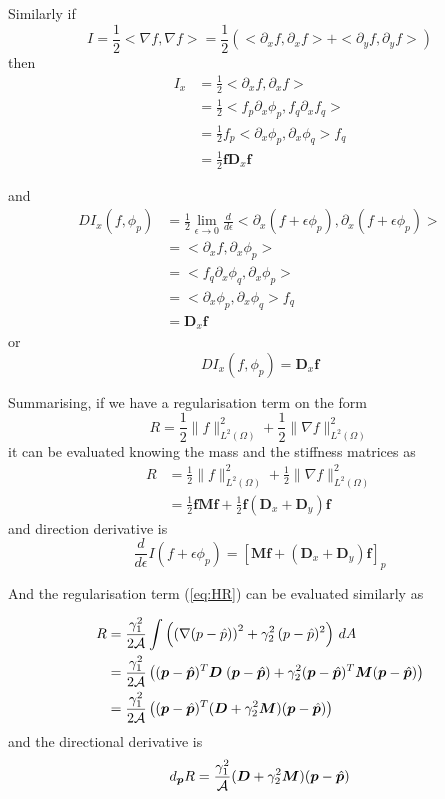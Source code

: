 \documentclass[10pt,a4paper]{book}
\newcommand{\p}{\partial}
\begin{document}
Similarly if
\[ 
I=\frac{1}{2} < \nabla f , \nabla f> = \frac{1}{2} ( <\p_x f, \p_x f> + < \p_y f, \p_y f> )
\]
then
\begin{align*}
 I_x & = \frac{1}{2} <\p_x f, \p_x f> \\ 
     &= \frac{1}{2} < f_p \p_x \phi_p, f_q \p_x f_q> \\
     &= \frac{1}{2} f_p <  \p_x \phi_p,  \p_x \phi_q> f_q\\
     &= \frac{1}{2} \bm{f} \bm{D}_x \bm{f}
\end{align*}

and
\begin{align*} 
D I_x(f,\phi_p) &= \frac{1}{2}\lim_{\epsilon \to 0} \frac{d}{d \epsilon} < \p_x (f +\epsilon \phi_p) , \p_x (f+\epsilon \phi_p) > \\
              &=  <\p_x f  , \p_x \phi_p > \\
              &=  <f_q \p_x \phi_q  , \p_x \phi_p > \\
              &=  <\p_x \phi_p  , \p_x \phi_q > f_q\\
              &= \bm{D}_x \bm{f}
\end{align*}
or
\[
D I_x(f,\phi_p) = \bm{D}_x \bm{f}
\]


Summarising, if we have a regularisation term on the form
\[
R=\frac{1}{2} \| f \|^2_{L^2(\Omega)} + \frac{1}{2} \| \nabla f \|^2_{L^2(\Omega)}
\] 
it can be evaluated knowing the mass and the stiffness matrices as
\begin{align*}  
R &= \frac{1}{2} \| f \|^2_{L^2(\Omega)} + \frac{1}{2} \| \nabla f \|^2_{L^2(\Omega)} \\
  &= \frac{1}{2} \bm{f} \bm{M} \bm{f}  + \frac{1}{2} \bm{f} (\bm{D}_x + \bm{D}_y) \bm{f}
\end{align*}
and direction derivative is 
\[ \frac{d}{d\epsilon} I(f+\epsilon \phi_p) = [\bm{M} \bm{f} + (\bm{D}_x  + \bm{D}_y) \bm{f} ]_p \]



And the regularisation term (\ref{eq:HR}) can be evaluated similarly as

\begin{align*}
R 
&= \frac{\gamma_1^2}{2\cal{A}} \int \left (  \left ( \nabla( p - \hat{p}) \right )^2 + \gamma_2^2 \, (p-\hat{p})^2 \right ) \, dA \\
&= \frac{\gamma_1^2}{2\cal{A}} \left (  (\bm{p}-\hat{\bm{p}})^T \bm{D} \; (\bm{p} - \hat{\bm{p}}) + \gamma_2^2 (\bm{p}-\hat{\bm{p}})^T \bm{M} (\bm{p} - \hat{\bm{p}}) \right )\\
&= \frac{\gamma_1^2}{2\cal{A}} \left (  (\bm{p}-\hat{\bm{p}})^T (\bm{D} + \gamma_2^2 \bm{M}) (\bm{p} - \hat{\bm{p}}) \right )
\end{align*}
and the directional derivative is
\[
d_{\bm{p}} R =\frac{\gamma_1^2}{\cal{A}} (\bm{D}+\gamma_2^2 \bm{M}) (\bm{p}-\hat{\bm{p}})
\]
\end{document}
